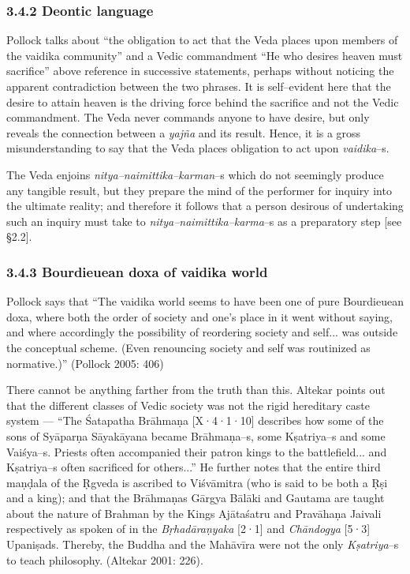 \subsubsection*{3.4.2 Deontic language}

Pollock talks about “the obligation to act that the Veda places upon members of the vaidika community” and a Vedic commandment “He who desires heaven must sacrifice” above reference in successive statements, perhaps without noticing the apparent contradiction between the two phrases. It is self–evident here that the desire to attain heaven is the driving force behind the sacrifice and not the Vedic commandment. The Veda never commands anyone to have desire, but only reveals the connection between a \textit{yajña} and its result. Hence, it is a gross misunderstanding to say that the Veda places obligation to act upon \textit{vaidika}–s.

The Veda enjoins \textit{nitya–naimittika–karman}–s which do not seemingly produce any tangible result, but they prepare the mind of the performer for inquiry into the ultimate reality; and therefore it follows that a person desirous of undertaking such an inquiry must take to \textit{nitya–naimittika–karma}–s as a preparatory step [see §2.2].


\subsubsection*{3.4.3 Bourdieuean doxa of vaidika world}

Pollock says that “The vaidika world seems to have been one of pure Bourdieuean doxa, where both the order of society and one’s place in it went without saying, and where accordingly the possibility of reordering society and self... was outside the conceptual scheme. (Even renouncing society and self was routinized as normative.)” (Pollock 2005: 406)

There cannot be anything farther from the truth than this. Altekar points out that the different classes of Vedic society was not the rigid hereditary caste system — “The Śatapatha Brāhmaṇa [X·4·1·10] describes how some of the sons of Syāparṇa Sāyakāyana became Brāhmaṇa–s, some Kṣatriya–s and some Vaiśya–s. Priests often accompanied their patron kings to the battlefield... and Kṣatriya–s often sacrificed for others...” He further notes that the entire third maṇḍala of the Ṛgveda is ascribed to Viśvāmitra (who is said to be both a Ṛṣi and a king); and that the Brāhmaṇas Gārgya Bālāki and Gautama are taught about the nature of Brahman by the Kings Ajātaśatru and Pravāhaṇa Jaivali respectively as spoken of in the \textit{Bṛhadāraṇyaka} [2·1] and \textit{Chāndogya} [5·3] Upaniṣads. Thereby, the Buddha and the Mahāvīra were not the only \textit{Kṣatriya}–s to teach philosophy. (Altekar 2001: 226).

